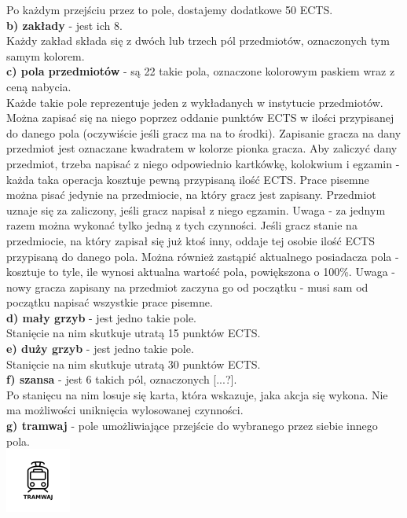 \documentclass[a4paper]{article}
\begin{document}
\indent Po każdym przejściu przez to pole, dostajemy dodatkowe 50 ECTS.\\
\noindent \textbf{b) zakłady} - jest ich 8.\\
\indent Każdy zakład składa się z dwóch lub trzech pól przedmiotów, oznaczonych tym samym kolorem.\\
\noindent \textbf{c) pola przedmiotów} - są 22 takie pola, oznaczone kolorowym paskiem wraz z ceną nabycia.\\ \indent Każde takie pole reprezentuje jeden z wykładanych w instytucie przedmiotów. Można zapisać się na niego poprzez oddanie punktów ECTS w ilości przypisanej do danego pola (oczywiście jeśli gracz ma na to środki). Zapisanie gracza na dany przedmiot jest oznaczane kwadratem w kolorze pionka gracza. Aby zaliczyć dany przedmiot, trzeba napisać z niego odpowiednio kartkówkę, kolokwium i egzamin - każda taka operacja kosztuje pewną przypisaną ilość ECTS. Prace pisemne można pisać jedynie na przedmiocie, na który gracz jest zapisany. Przedmiot uznaje się za zaliczony, jeśli gracz napisał z niego egzamin. Uwaga - za jednym razem można wykonać tylko jedną z tych czynności. Jeśli gracz stanie na przedmiocie, na który zapisał się już ktoś inny, oddaje tej osobie ilość ECTS przypisaną do danego pola. Można również zastąpić aktualnego posiadacza pola - kosztuje to tyle, ile wynosi aktualna wartość pola, powiększona o 100\%. Uwaga - nowy gracza zapisany na przedmiot zaczyna go od początku - musi sam od początku napisać wszystkie prace pisemne.\\ 
\noindent \textbf{d) mały grzyb} - jest jedno takie pole.\\
\indent Stanięcie na nim skutkuje utratą 15 punktów ECTS.\\
\noindent \textbf{e) duży grzyb} - jest jedno takie pole.\\
\indent Stanięcie na nim skutkuje utratą 30 punktów ECTS.\\
\noindent \textbf{f) szansa} - jest 6 takich pól, oznaczonych [...?]. \\
\indent Po stanięcu na nim losuje się karta, która wskazuje, jaka akcja się wykona. Nie ma możliwości uniknięcia wylosowanej czynności.\\
\noindent \textbf{g) tramwaj} - pole umożliwiające przejście do wybranego przez siebie innego pola.\\
\indent\includegraphics[scale=0.8]{tram.png}\\
\end{document}
